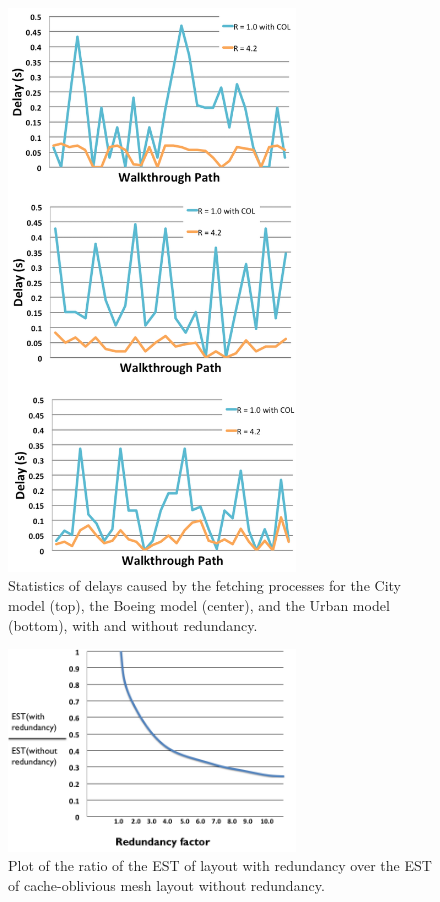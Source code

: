 \begin{figure}[ht]
\centering
\includegraphics[width=3.0in]
{resultall.png}
  \caption{Statistics of delays caused by the fetching processes for the City model (top), the Boeing model (center), and
the Urban model (bottom), with and without redundancy. }
  \label{fig:resultall}
\end{figure} 

\begin{figure}[ht]
\centering
\includegraphics[width=3.0in]{statistic.png}
  \caption{Plot of the ratio of the EST of layout with redundancy over the EST of cache-oblivious mesh layout without redundancy. }
  \label{fig:statistic}
\end{figure} 

